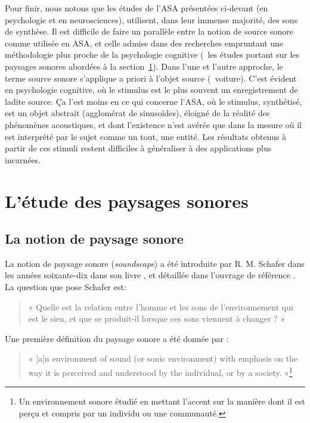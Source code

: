 Pour finir, nous notons que les études de l'ASA présentées ci-devant (en psychologie et en neurosciences), utilisent, dans leur immense majorité, des sons de synthèse. Il est difficile de faire un parallèle entre la notion de source sonore comme utilisée en ASA, et celle admise dans des recherches empruntant une méthodologie plus proche de la psychologie cognitive (\cf~les études portant sur les paysages sonores abordées à la section~\ref{sec:ch3_paysageSonore}). Dans l'une et l'autre approche, le terme source sonore s'applique a priori à l'objet source (\eg~voiture). C'est évident en psychologie cognitive, où le stimulus est le plus souvent un enregistrement de ladite source. Ça l'est moins en ce qui concerne l'ASA, où le stimulus, synthétisé, est un objet abstrait (agglomérat de sinusoïdes), éloigné de la réalité des phénomènes acoustiques, et dont l'existence n'est avérée que dans la mesure où il est interprété par le sujet comme un tout, une entité. Les résultats obtenus à partir de ces stimuli restent difficiles à généraliser à des applications plus incarnées.

\section{L'étude des paysages sonores}
\label{sec:ch3_paysageSonore}

\subsection{La notion de paysage sonore}

La notion de paysage sonore (\emph{soundscape}) a été introduite par R. M. Schafer dans les années soixante-dix dans son livre \citep{schafer1969new}, et détaillée dans l'ouvrage de référence \citep{schafer1977tuning}. La question que pose Schafer est:

\begin{quote}
« Quelle est la relation entre l'homme et les sons de l'environnement qui est le sien, et que se produit-il lorsque ces sons viennent à changer ? »
\end{quote}

Une première définition du paysage sonore a été donnée par \citep{truax1978handbook}:

\begin{quote}
« [a]n environment of sound (or sonic environment) with emphasis on the way it is perceived and understood by the individual, or by a society. »\footnote{Un environnement sonore étudié en mettant l'accent sur la manière dont il est perçu et compris par un individu ou une communauté.}
\end{quote}

